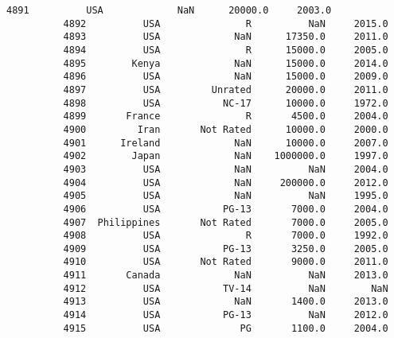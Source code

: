 \documentclass[11pt]{article}
\begin{document}
\begin{Verbatim}[commandchars=\\\{\}]
          4891          USA             NaN      20000.0     2003.0   
          4892          USA               R          NaN     2015.0   
          4893          USA             NaN      17350.0     2011.0   
          4894          USA               R      15000.0     2005.0   
          4895        Kenya             NaN      15000.0     2014.0   
          4896          USA             NaN      15000.0     2009.0   
          4897          USA         Unrated      20000.0     2011.0   
          4898          USA           NC-17      10000.0     1972.0   
          4899       France               R       4500.0     2004.0   
          4900         Iran       Not Rated      10000.0     2000.0   
          4901      Ireland             NaN      10000.0     2007.0   
          4902        Japan             NaN    1000000.0     1997.0   
          4903          USA             NaN          NaN     2004.0   
          4904          USA             NaN     200000.0     2012.0   
          4905          USA             NaN          NaN     1995.0   
          4906          USA           PG-13       7000.0     2004.0   
          4907  Philippines       Not Rated       7000.0     2005.0   
          4908          USA               R       7000.0     1992.0   
          4909          USA           PG-13       3250.0     2005.0   
          4910          USA       Not Rated       9000.0     2011.0   
          4911       Canada             NaN          NaN     2013.0   
          4912          USA           TV-14          NaN        NaN   
          4913          USA             NaN       1400.0     2013.0   
          4914          USA           PG-13          NaN     2012.0   
          4915          USA              PG       1100.0     2004.0   
          

\end{Verbatim}
\end{document}
